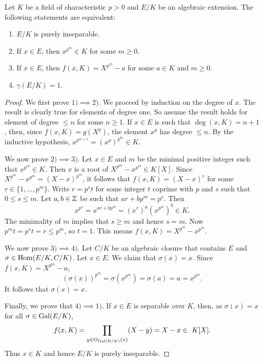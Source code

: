 \begin{proposition}
Let $K$ be a field of characteristic $p>0$ and
$E/K$ be an algebraic extension. The following statements are equivalent:
\begin{enumerate}
    \item $E/K$ is purely inseparable.
    \item If $x\in E$, then $x^{p^m}\in K$ for some $m\geq0$.
    \item If $x\in E$, then $f(x,K)=X^{p^m}-a$ for some $a\in K$ and $m\geq0$. 
    \item $\gamma(E/K)=1$. 
\end{enumerate}
\end{proposition}

\begin{proof}
    We first prove $1)\implies 2)$. We proceed by induction on the degree of $x$. The result
    is clearly true for elements of degree one. So assume the result holds for element of degree $\leq n$ 
    for some $n\geq1$. 
    If $x\in E$ is such that $\deg(x,K)=n+1$, then, since $f(x,K)=g(X^p)$, the element 
    $x^p$ has degree $\leq n$. By the inductive hypothesis, $x^{p^{m+1}}=(x^p)^{p^m}\in K$.  
    
    We now prove $2)\implies 3)$. Let $x\in E$ and $m$ be the minimal positive integer 
    such that $x^{p^m}\in K$. Then
    $x$ is a root of $X^{p^m}-x^{p^m}\in K[X]$. Since 
    $X^{p^m}-x^{p^m}=(X-x)^{p^m}$, it follows that $f(x,K)=(X-x)^r$ for some
    $r\in\{1,\dots,p^m\}$. Write $r=p^st$ for some integer $t$ coprime with $p$ and $s$ such that
    $0\leq s\leq m$. Let $a,b\in\mathbb{Z}$ be such that $ar+bp^m=p^s$. Then 
    \[
    x^{p^s}=x^{ar+bp^m}=\left(x^r\right)^a\left(x^{p^m}\right)^b\in K.
    \]
    The minimality of $m$ implies that $s\geq m$ and hence $s=m$. Now $p^mt=p^st=r\leq p^m$, so $t=1$. 
    This means $f(x,K)=X^{p^m}-x^{p^m}$. 
    
    We now prove $3)\implies 4)$. Let $C/K$ be an algebraic closure that contains $E$
    and $\sigma\in\operatorname{Hom}(E/K,C/K)$. Let $x\in E$. We claim that $\sigma(x)=x$. Since 
    $f(x,K)=X^{p^m}-a$, 
    \[
    \left(\sigma(x)\right)^{p^m}=\sigma\left(x^{p^m}\right)=\sigma(a)=a=x^{p^m}.
    \]
    It follows that $\sigma(x)=x$. 
    
    Finally, we prove that $4)\implies1)$. If $x\in E$ is separable over $K$, then, 
    as $\sigma(x)=x$ for all $\sigma\in\operatorname{Gal}(E/K)$, 
    \[
    f(x,K)=\prod_{y\in O_{\Gal(E/K)}(x)}(X-y)=X-x\in\ K[X].
    \]
    Thus $x\in K$ and hence $E/K$ is purely inseparable. 
\end{proof}


